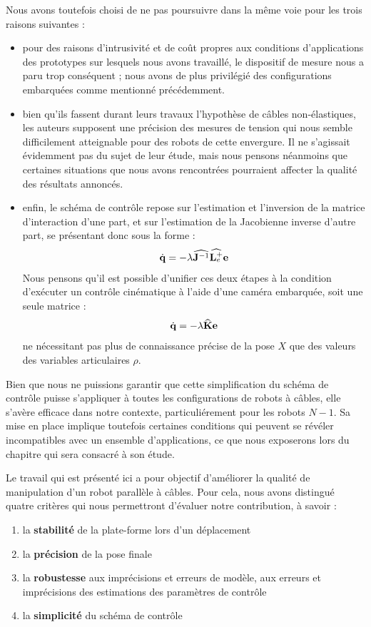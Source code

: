 Nous avons toutefois choisi de ne pas poursuivre dans la m\^eme voie pour
les trois raisons suivantes :
\begin{itemize}
 \item pour des raisons d'intrusivit\'e et de co\^ut propres aux conditions
d'applications des prototypes sur lesquels nous avons travaill\'e, le
dispositif de mesure nous a paru trop cons\'equent ; nous avons
de plus privil\'egi\'e des configurations embarqu\'ees comme mentionn\'e
pr\'ec\'edemment.
\item bien qu'ils fassent durant leurs travaux l'hypoth\`ese de c\^ables
non-\'elastiques, les auteurs supposent une pr\'ecision des mesures de tension
qui nous semble difficilement atteignable pour des robots de cette envergure. Il
ne s'agissait \'evidemment pas du sujet de leur \'etude, mais nous pensons
n\'eanmoins que certaines situations que nous avons rencontr\'ees pourraient
affecter la qualit\'e des r\'esultats annonc\'es. 
\item enfin, le sch\'ema de contr\^ole repose sur l'estimation et l'inversion
de la matrice d'interaction d'une part, et sur l'estimation de la Jacobienne
inverse d'autre part, se pr\'esentant donc sous la forme :
\begin{equation}
\dot {\bf q} = - \lambda \widehat {{\bf J}^{-1}} \widehat{ {\bf L}_e^+} {\bf e} 
\label{intro:eq25}
\end{equation}
Nous pensons qu'il est possible d'unifier ces deux \'etapes \`a la condition
d'ex\'ecuter un contr\^ole cin\'ematique \`a l'aide d'une cam\'era embarqu\'ee,
soit une seule matrice :
\begin{equation}
\dot {\bf q} = - \lambda \widehat {\bf K} {\bf e} 
\label{intro:eq26}
\end{equation}
ne n\'ecessitant pas plus de connaissance pr\'ecise de la pose $X$ que des
valeurs des variables articulaires $\rho$.
\end{itemize}

Bien que nous ne puissions garantir que cette simplification du sch\'ema de
contr\^ole puisse s'appliquer \`a toutes les configurations de robots \`a
c\^ables, elle s'av\`ere efficace dans notre contexte, particuli\'erement pour
les robots $N-1$. Sa mise en place implique toutefois certaines conditions qui
peuvent se r\'ev\'eler incompatibles avec un ensemble d'applications, ce que
nous exposerons lors du chapitre qui sera consacr\'e \`a son \'etude.

Le travail qui est pr\'esent\'e ici a pour objectif d'am\'eliorer la qualit\'e
de manipulation d'un robot parall\`ele \`a c\^ables. Pour cela, nous avons
distingu\'e quatre crit\`eres qui nous permettront d'\'evaluer notre
contribution, \`a savoir :
\begin{enumerate}
 \item la {\bf stabilit\'e} de la plate-forme lors d'un d\'eplacement
 \item la {\bf pr\'ecision} de la pose finale
 \item la {\bf robustesse} aux impr\'ecisions et erreurs de mod\`ele, aux
erreurs et impr\'ecisions des estimations des param\`etres de contr\^ole
  \item la {\bf simplicit\'e} du sch\'ema de contr\^ole
\end{enumerate}

